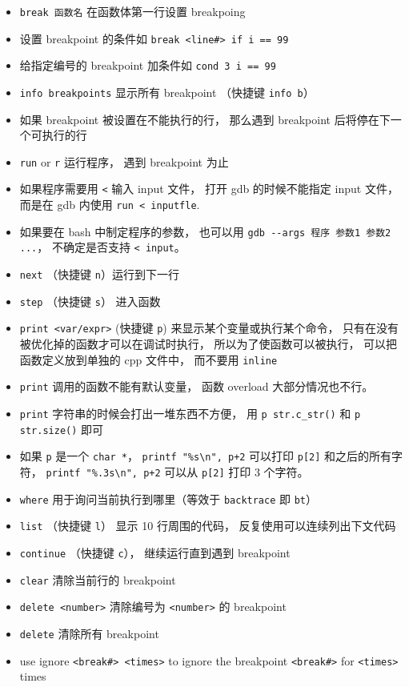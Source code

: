 \begin{itemize}
\item \verb`break 函数名` 在函数体第一行设置 breakpoing
\item 设置 breakpoint 的条件如 \verb`break <line#> if i == 99`
\item 给指定编号的 breakpoint 加条件如 \verb`cond 3 i == 99`
\item \verb`info breakpoints` 显示所有 breakpoint （快捷键 \verb`info b`）
\item 如果 breakpoint 被设置在不能执行的行， 那么遇到 breakpoint 后将停在下一个可执行的行
\item \verb`run` or \verb`r` 运行程序， 遇到 breakpoint 为止
\item 如果程序需要用 \verb`<` 输入 input 文件， 打开 gdb 的时候不能指定 input 文件， 而是在 gdb 内使用 \verb`run < inputfle`.
\item 如果要在 bash 中制定程序的参数， 也可以用 \verb|gdb --args 程序 参数1 参数2 ...|， 不确定是否支持 \verb|< input|。
\item \verb`next` （快捷键 \verb`n`）运行到下一行 
\item \verb`step` （快捷键 \verb`s`） 进入函数
\item \verb`print <var/expr>` (快捷键 \verb`p`) 来显示某个变量或执行某个命令， 只有在没有被优化掉的函数才可以在调试时执行， 所以为了使函数可以被执行， 可以把函数定义放到单独的 cpp 文件中， 而不要用 \verb`inline`
\item \verb`print` 调用的函数不能有默认变量， 函数 overload 大部分情况也不行。
\item \verb`print` 字符串的时候会打出一堆东西不方便， 用 \verb`p str.c_str()` 和 \verb`p str.size()` 即可
\item 如果 \verb`p` 是一个 \verb`char *`， \verb`printf "%s\n", p+2` 可以打印 \verb`p[2]` 和之后的所有字符， \verb`printf "%.3s\n", p+2` 可以从 \verb`p[2]` 打印 3 个字符。
\item \verb`where` 用于询问当前执行到哪里（等效于 \verb`backtrace` 即 \verb`bt`）
\item \verb`list` （快捷键 \verb`l`） 显示 10 行周围的代码， 反复使用可以连续列出下文代码
\item \verb`continue` （快捷键 \verb`c`）， 继续运行直到遇到 breakpoint
\item \verb`clear` 清除当前行的 breakpoint
\item \verb`delete <number>` 清除编号为 \verb`<number>` 的 breakpoint
\item \verb`delete` 清除所有 breakpoint
\item use ignore \verb`<break#> <times>` to ignore the breakpoint \verb`<break#>` for \verb`<times>` times

\end{itemize}
